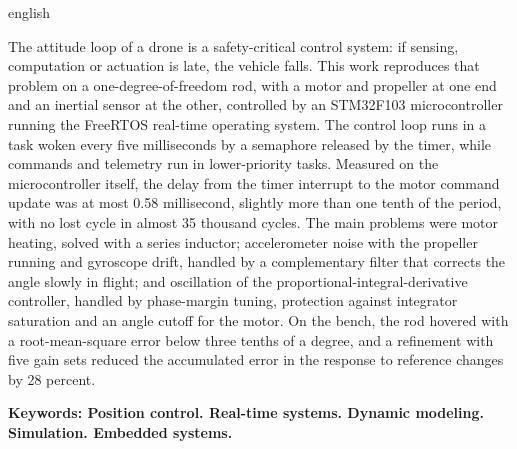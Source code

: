\begin{otherlanguage*}{english}
\begin{resumo}[ABSTRACT]
\begin{SingleSpace}
\noindent The attitude loop of a drone is a safety-critical control system: if sensing, computation or actuation is late, the vehicle falls. This work reproduces that problem on a one-degree-of-freedom rod, with a motor and propeller at one end and an inertial sensor at the other, controlled by an STM32F103 microcontroller running the FreeRTOS real-time operating system. The control loop runs in a task woken every five milliseconds by a semaphore released by the timer, while commands and telemetry run in lower-priority tasks. Measured on the microcontroller itself, the delay from the timer interrupt to the motor command update was at most 0.58 millisecond, slightly more than one tenth of the period, with no lost cycle in almost 35 thousand cycles. The main problems were motor heating, solved with a series inductor; accelerometer noise with the propeller running and gyroscope drift, handled by a complementary filter that corrects the angle slowly in flight; and oscillation of the proportional-integral-derivative controller, handled by phase-margin tuning, protection against integrator saturation and an angle cutoff for the motor. On the bench, the rod hovered with a root-mean-square error below three tenths of a degree, and a refinement with five gain sets reduced the accumulated error in the response to reference changes by 28 percent.
\par\vspace{2\baselineskip}
\noindent\textbf{Keywords: Position control. Real-time systems. Dynamic modeling. Simulation. Embedded systems.}
\end{SingleSpace}
\end{resumo}
\end{otherlanguage*}
